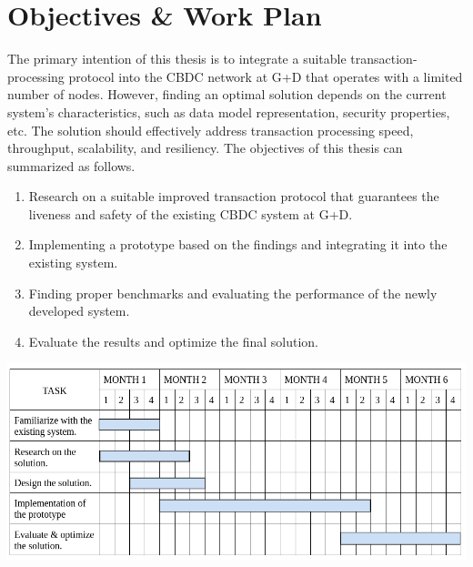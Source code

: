 \documentclass[
  english,        %
  font=times,     %
  onecolumn,      %
]{tumarticle}
\begin{document}
\section{Objectives \& Work Plan}
\hspace{2em} The primary intention of this thesis is to integrate a suitable transaction-processing protocol into the CBDC network at G+D that operates with a limited number of nodes. However, finding an optimal solution depends on the current system's characteristics, such as data model representation, security properties, etc. The solution should effectively address transaction processing speed, throughput, scalability, and resiliency. The objectives of this thesis can summarized as follows. 
\begin{enumerate}
\item Research on a suitable improved transaction protocol that guarantees the liveness and safety of the existing CBDC system at G+D.
\item Implementing a prototype based on the findings and integrating it into the existing system.
\item Finding proper benchmarks and evaluating the performance of the newly developed system.
\item Evaluate the results and optimize the final solution.
\end{enumerate}
\includegraphics[scale=0.5]{images/timeline.png}



\end{document}
